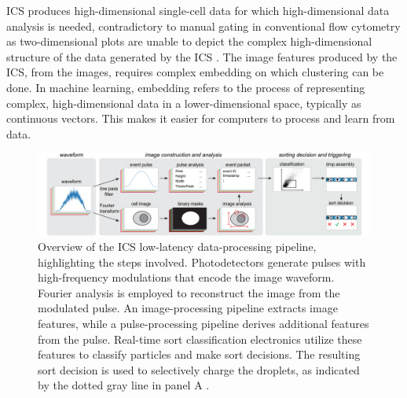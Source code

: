 \documentclass[12pt,a4paper]{article}
\begin{document}
ICS produces high-dimensional single-cell data for which high-dimensional data analysis is needed, contradictory to manual gating in conventional flow cytometry as two-dimensional plots are unable to depict the complex high-dimensional structure of the data generated by the ICS \cite{doi:10.1126/science.abj3013}. The image features produced by the ICS, from the images, requires complex embedding on which clustering can be done. In machine learning, embedding refers to the process of representing complex, high-dimensional data in a lower-dimensional space, typically as continuous vectors. This makes it easier for computers to process and learn from data.

\begin{figure}
  \centering
  \includegraphics[width=\textwidth]{Figures/DataProcessingPipelineICS.png}
  \caption{Overview of the ICS low-latency data-processing pipeline, highlighting the steps involved. Photodetectors generate pulses with high-frequency modulations that encode the image waveform. Fourier analysis is employed to reconstruct the image from the modulated pulse. An image-processing pipeline extracts image features, while a pulse-processing pipeline derives additional features from the pulse. Real-time sort classification electronics utilize these features to classify particles and make sort decisions. The resulting sort decision is used to selectively charge the droplets, as indicated by the dotted gray line in panel A \cite{doi:10.1126/science.abj3013}.}
  \label{icsdataprocessing}
\end{figure}
\end{document}
